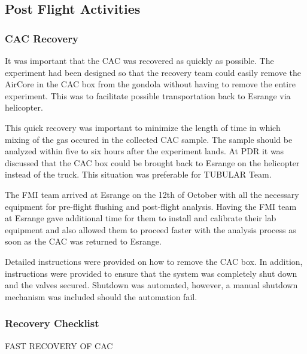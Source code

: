 \subsection{Post Flight Activities}

\subsubsection{CAC Recovery}
It was important that the CAC was recovered as quickly as possible. The experiment had been designed so that the recovery team could easily remove the AirCore in the CAC box from the gondola without having to remove the entire experiment. This was to facilitate possible transportation back to Esrange via helicopter.

This quick recovery was important to minimize the length of time in which mixing of the gas occured in the collected CAC sample. The sample should be analyzed within five to six hours after the experiment lands. At PDR it was discussed that the CAC box could be brought back to Esrange on the helicopter instead of the truck. This situation was preferable for TUBULAR Team. 

The FMI team arrived at Esrange on the 12th of October with all the necessary equipment for pre-flight flushing and post-flight analysis. Having the FMI team at Esrange gave additional time for them to install and calibrate their lab equipment and also allowed them to proceed faster with the analysis process as soon as the CAC was returned to Esrange. 

Detailed instructions were provided on how to remove the CAC box. In addition, instructions were provided to ensure that the system was completely shut down and the valves secured. Shutdown was automated, however, a manual shutdown mechanism was included should the automation fail.

\subsubsection{Recovery Checklist}
\label{sec:recovery-checklist}

FAST RECOVERY OF CAC


